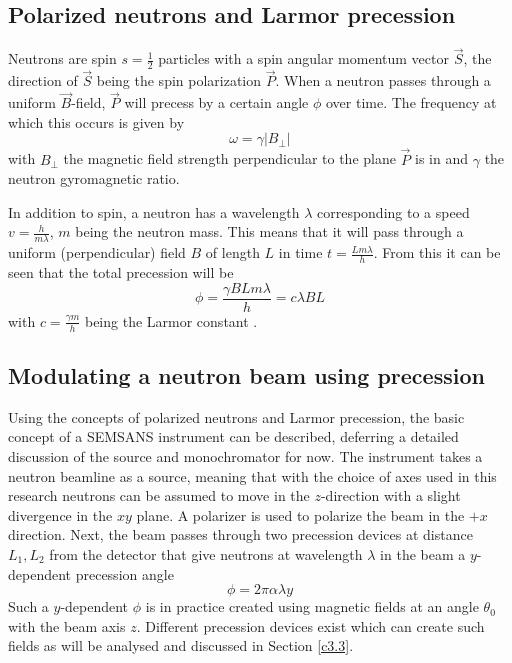 \documentclass{article}
\begin{document}
\subsection{Polarized neutrons and Larmor precession}
\label{c2.1}
Neutrons are spin $s=\frac{1}{2}$ particles with a spin angular momentum vector $\vec{S}$, the direction of $\vec{S}$ being the spin polarization $\vec{P}$. When a neutron passes through a uniform $\vec{B}$-field, $\vec{P}$ will precess by a certain angle $\phi$ over time. The frequency at which this occurs is given by
$$\omega = \gamma |B_\perp|$$
with $B_\perp$ the magnetic field strength perpendicular to the plane $\vec{P}$ is in and $\gamma$ the neutron gyromagnetic ratio. 

In addition to spin, a neutron has a wavelength $\lambda$ corresponding to a speed $v = \frac{h}{m\lambda}$, $m$ being the neutron mass. This means that it will pass through a uniform (perpendicular) field $B$ of length $L$ in time $t = \frac{Lm\lambda}{h}$. From this it can be seen that the total precession will be 
\begin{equation}
	\phi = \frac{\gamma B L m\lambda}{h} = c\lambda B L \label{eq:larmor-prec}
\end{equation}
with $c = \frac{\gamma m}{h}$ being the Larmor constant \cite{bouwman2021b}.   
\subsection{Modulating a neutron beam using precession}
\label{c2.2}
Using the concepts of polarized neutrons and Larmor precession, the basic concept of a SEMSANS instrument can be described, deferring a detailed discussion of the source and monochromator for now. The instrument takes a neutron beamline as a source, meaning that with the choice of axes used in this research neutrons can be assumed to move in the $z$-direction with a slight divergence in the $xy$ plane. A polarizer is used to polarize the beam in the $+x$ direction. Next, the beam passes through two precession devices at distance $L_1, L_2$ from the detector that give neutrons at wavelength $\lambda$ in the beam a $y$-dependent precession angle
\begin{equation}
	\phi = 2\pi\alpha\lambda y \label{eq:precession-freq}
\end{equation}
Such a $y$-dependent $\phi$ is in practice created using magnetic fields at an angle $\theta_0$ with the beam axis $z$. Different precession devices exist which can create such fields as will be analysed and discussed in Section \ref{c3.3}.
\end{document}
